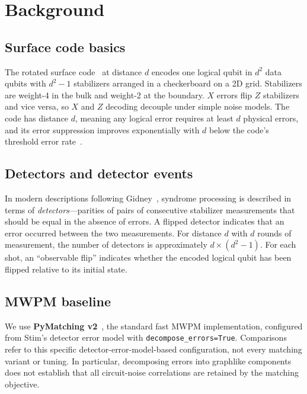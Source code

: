 \documentclass[11pt,a4paper]{article}
\begin{document}
\section{Background}
\label{sec:background}

\subsection{Surface code basics}

The rotated surface code~\cite{bravyi1998,fowler2012} at distance $d$
encodes one logical qubit in $d^2$ data qubits with $d^2 - 1$
stabilizers arranged in a checkerboard on a 2D grid. Stabilizers are
weight-4 in the bulk and weight-2 at the boundary. $X$ errors flip $Z$
stabilizers and vice versa, so $X$ and $Z$ decoding decouple under
simple noise models. The code has distance $d$, meaning any logical
error requires at least $d$ physical errors, and its error suppression
improves exponentially with $d$ below the code's threshold error
rate~\cite{dennis2002,fowler2012}.

\subsection{Detectors and detector events}

In modern descriptions following Gidney~\cite{gidney2021stim}, syndrome
processing is described in terms of \emph{detectors}---parities of pairs
of consecutive stabilizer measurements that should be equal in the
absence of errors. A flipped detector indicates that an error occurred
between the two measurements. For distance $d$ with $d$ rounds of
measurement, the number of detectors is approximately
$d \times (d^2 - 1)$. For each shot, an ``observable flip'' indicates
whether the encoded logical qubit has been flipped relative to its
initial state.

\subsection{MWPM baseline}

We use \textbf{PyMatching v2}~\cite{higgott2022pymatching,higgott2025sparse},
the standard fast MWPM implementation, configured from Stim's detector
error model with \texttt{decompose\_errors=True}. Comparisons refer to this specific detector-error-model-based
configuration, not every matching variant or tuning. In particular,
decomposing errors into graphlike components does not establish that all
circuit-noise correlations are retained by the matching objective.
\end{document}
